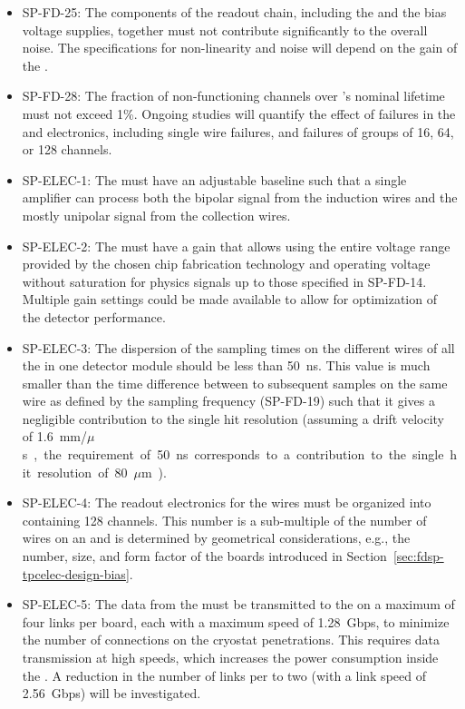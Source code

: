 \begin{itemize}
\item SP-FD-25: 
The components of the readout chain, including the 
and the bias voltage supplies, together must not contribute significantly to
the overall noise. The  specifications for non-linearity and 
noise will depend on the gain of the .

\item SP-FD-28: The fraction of non-functioning channels over 
's nominal \dunelifetime lifetime must not exceed 1\%. 
Ongoing studies will quantify the effect of failures
in the  and electronics, including
single wire failures, and failures of groups of
\num{16}, \num{64}, or \num{128} channels.

\item SP-ELEC-1: The  must have an adjustable baseline such that a single
amplifier can process both the bipolar signal from the induction wires and the mostly 
unipolar signal from the collection wires. 

\item SP-ELEC-2: The  must have a gain that allows using the entire
voltage range provided by the chosen chip fabrication technology and operating
voltage without saturation for physics signals up to those specified in
SP-FD-14. Multiple gain settings could be made available to allow for optimization
of the detector performance.

\item SP-ELEC-3: The dispersion of the sampling times on the different wires of
all the  in one   detector module should
be less than \SI{50}{ns}. This value is much smaller than the 
time difference between to subsequent samples on the same wire
as defined by the sampling frequency (SP-FD-19) such that it gives
a negligible contribution to the single hit resolution (assuming
a drift velocity of \SI{1.6}{mm/$\mu$s}, the requirement of \SI{50}{ns}
corresponds to a contribution to the single hit resolution of \SI{80}{$\mu$m}).

\item SP-ELEC-4: The readout electronics for the  wires must be organized
into  containing 128 channels. This number is a sub-multiple
of the number of wires on an  and is determined
by geometrical considerations, e.g., the number, size, and form
factor of the  boards introduced in Section~\ref{sec:fdsp-tpcelec-design-bias}.

\item SP-ELEC-5: The data from the  must be transmitted to the
 on a maximum of four links per board, each with a maximum
speed of \SI{1.28}{Gbps}, to minimize
the number of connections on the cryostat penetrations. This 
requires data transmission at high speeds, which 
increases the power consumption inside the .
A reduction in the number of links per  to two
(with a link speed of \SI{2.56}{Gbps}) will be investigated.


\end{itemize}
